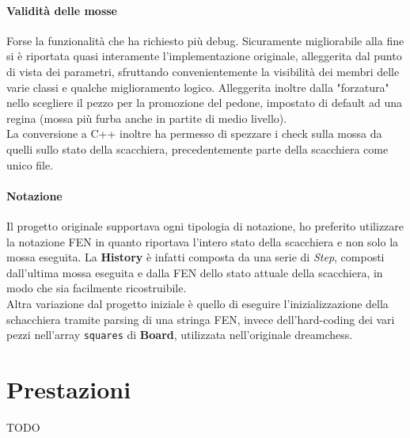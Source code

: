 \documentclass{article}
\begin{document}
        \paragraph{Validità delle mosse}
            Forse la funzionalità che ha richiesto più debug.
            Sicuramente migliorabile alla fine si è riportata quasi interamente l'implementazione originale, alleggerita dal punto di vista dei parametri, sfruttando convenientemente la visibilità dei membri delle varie classi e qualche miglioramento logico.
            Alleggerita inoltre dalla "forzatura" nello scegliere il pezzo per la promozione del pedone, impostato di default ad una regina (mossa più furba anche in partite di medio livello).\\
            La conversione a C++ inoltre ha permesso di spezzare i check sulla mossa da quelli sullo stato della scacchiera, precedentemente parte della scacchiera come unico file.
        \paragraph{Notazione}
            Il progetto originale supportava ogni tipologia di notazione, ho preferito utilizzare la notazione FEN in quanto riportava l'intero stato della scacchiera e non solo la mossa eseguita.
            La \textbf{History} è infatti composta da una serie di \textit{Step}, composti dall'ultima mossa eseguita e dalla FEN dello stato attuale della scacchiera, in modo che sia facilmente ricostruibile.\\
            Altra variazione dal progetto iniziale è quello di eseguire l'inizializzazione della schacchiera tramite parsing di una stringa FEN, invece dell'hard-coding dei vari pezzi nell'array \texttt{squares} di \textbf{Board}, utilizzata nell'originale dreamchess.
    \newpage
    \section{Prestazioni}
        TODO
\end{document}
